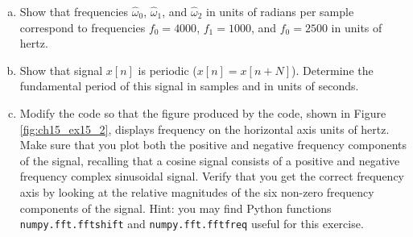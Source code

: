 \begin{enumerate}


\begin{enumerate}[a)]
    \item Show that frequencies $\hat{\omega}_0$, $\hat{\omega}_1$, and $\hat{\omega}_2$ in units of radians per sample correspond to frequencies $f_0=4000$, $f_1=1000$, and $f_0=2500$ in units of hertz.
    \item Show that signal $x[n]$ is periodic ($x[n]=x[n+N]$). Determine the fundamental period of this signal in samples and in units of seconds. 
    \item Modify the code so that the figure produced by the code, shown in Figure \ref{fig:ch15_ex15_2}, displays frequency on the horizontal axis units of hertz. Make sure that you plot both the positive and negative frequency components of the signal, recalling that a cosine signal consists of a positive and negative frequency complex sinusoidal signal. Verify that you get the correct frequency axis by looking at the relative magnitudes of the six non-zero frequency components of the signal. Hint: you may find Python functions \verb|numpy.fft.fftshift| and \verb|numpy.fft.fftfreq| useful for this exercise.
\end{enumerate}


\end{enumerate}
